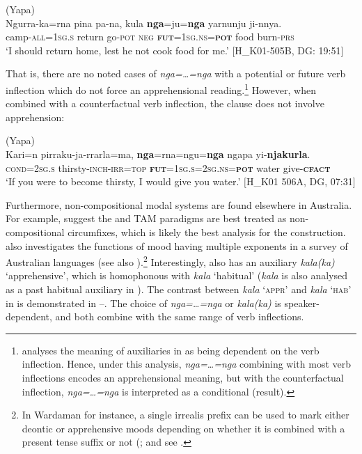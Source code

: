 \documentclass[output=paper,colorlinks,citecolor=brown]{langscibook}
\begin{document}
\ea 
\textnormal{ (Yapa)} \\
\gll Ngurra-ka=rna pina pa-na, kula \textbf{nga}=ju=\textbf{nga} yarnunju ji-nnya. \\
camp-\textsc{all=1sg.s} return go-\textsc{pot} \textsc{neg} \textsc{\textbf{fut}=1sg.ns=\textbf{pot}} food burn-\textsc{prs} \\
\glt `I should return home, lest he not cook food for me.' $[$H\_K01-505B, DG: 19:51$]$
\label{ex:bro56}
\z

\newpage

\noindent That is, there are no noted cases of \textit{nga=\ldots=nga} with a potential or future verb inflection which do not force an apprehensional reading.\footnote{\citet{nash_grammatical_1979} analyses the meaning of auxiliaries in  as being dependent on the verb inflection. Hence, under this analysis, \textit{nga=\ldots=nga} combining with most verb inflections encodes an apprehensional meaning, but with the counterfactual inflection, \textit{nga=\ldots=nga} is interpreted as a conditional (result).} However, when combined with a counterfactual verb inflection, the clause does not involve apprehension:

\ea 
\textnormal{ (Yapa)} \\
\gll Kari=n pirraku-ja-rrarla=ma, \textbf{nga}=rna=ngu=\textbf{nga} ngapa yi-\textbf{njakurla}. \\
\textsc{cond=2sg.s} thirsty-\textsc{inch-irr=top} \textsc{\textbf{fut}=1sg.s=2sg.ns=\textbf{pot}} water give-\textsc{\textbf{cfact}} \\
\glt `If you were to become thirsty, I would give you water.' $[$H\_K01 506A, DG, 07:31$]$
\label{ex:bro}
\z

 Furthermore, non-compositional modal systems are found elsewhere in Australia. For example, \citet{caudal_comparative_2019} suggest the  and  TAM paradigms are best treated as non-compositional circumfixes, which is likely the best analysis for the  construction. \citet{verstraete_semantics_2005} also investigates the functions of mood having multiple exponents in a survey of Australian languages (see also \cite{legate_morpho-semantics_2003,iatridou_grammatical_2000,romero_fake_2014,caudal_polyfunctionality_2016}).\footnote{In Wardaman for instance, a single irrealis prefix can be used to mark either deontic or apprehensive moods depending on whether it is combined with a present tense suffix or not (\cite[179]{merlan_grammar_1994}; and see \cite[224--225]{verstraete_semantics_2005}.} Interestingly,  also has an auxiliary \textit{kala(ka)} `apprehensive', which is homophonous with \textit{kala} `habitual' (\textit{kala} is also analysed as a past habitual auxiliary in ). The contrast between \textit{kala} \textsc{`appr'} and \textit{kala} \textsc{`hab'} in  is demonstrated in --. The choice of \textit{nga=\ldots=nga} or \textit{kala(ka)} is speaker-dependent, and both combine with the same range of verb inflections.
\end{document}
